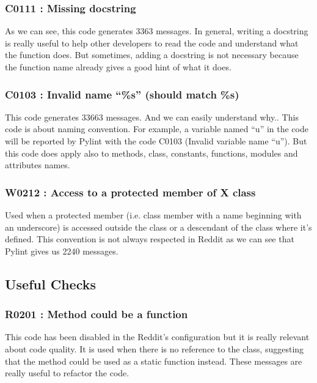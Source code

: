\documentclass[11pt, a4paper]{article}
\newcommand{\pyl}{\textsf{Pylint}}
\begin{document}
\subsubsection*{C0111 : Missing docstring}

As we can see, this code generates 3363 messages.
In general, writing a docstring is really useful to help other developers to read the code and understand what the function does.
But sometimes, adding a docstring is not necessary because the function name already gives a good hint of what it does.


\subsubsection*{C0103 : Invalid name ``\%s''  (should match \%s) }

This code generates 33663 messages. 
And we can easily understand why.. This code is about naming convention.
For example, a variable named ``u'' in the code will be reported by \pyl{} with the code C0103 (Invalid variable name ``u'').
But this code does apply also to methods, class, constants, functions, modules and attributes names.

\subsubsection*{W0212 : Access to a protected member of X class}

Used when a protected member (i.e. class member with a name beginning with an underscore) is accessed outside the class or a descendant of the class where it's defined.
This convention is not always respected in Reddit as we can see that \pyl{} gives us 2240 messages.


\subsection*{Useful Checks}

\subsubsection*{R0201 : Method could be a function}

This code has been disabled in the Reddit's configuration but it is really relevant about code quality. 
It is used when there is no reference to the class, suggesting that the method could be used as a static function instead.
These messages are really useful to refactor the code.
\end{document}
